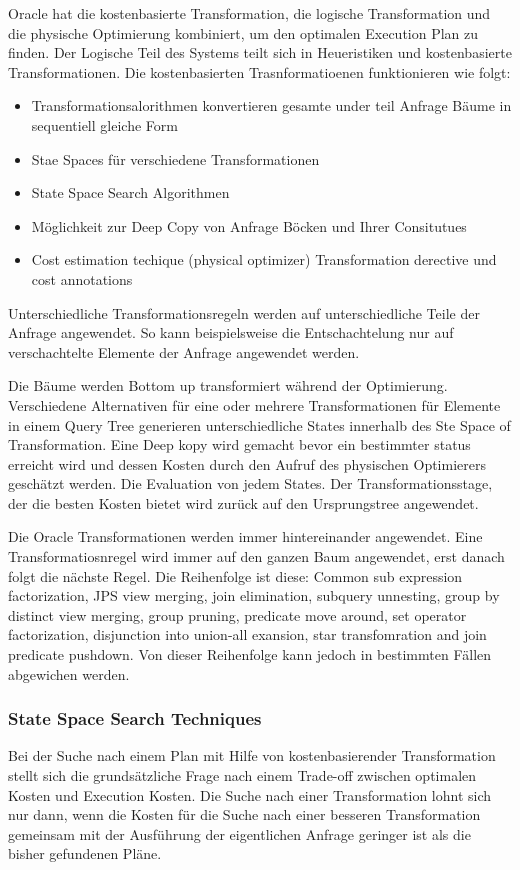 Oracle hat die kostenbasierte Transformation, die logische Transformation und die physische Optimierung kombiniert, um den optimalen Execution Plan zu finden. Der Logische Teil des Systems teilt sich in Heueristiken und kostenbasierte Transformationen. Die kostenbasierten Trasnformatioenen funktionieren wie folgt:

\begin{itemize}
\item Transformationsalorithmen konvertieren gesamte under teil Anfrage Bäume in sequentiell gleiche Form
\item Stae Spaces für verschiedene Transformationen
\item State Space Search Algorithmen
\item Möglichkeit zur Deep Copy von Anfrage Böcken und Ihrer Consitutues
\item Cost estimation techique (physical optimizer)
Transformation derective und cost annotations
\end{itemize}

Unterschiedliche Transformationsregeln werden auf unterschiedliche Teile der Anfrage angewendet. So kann beispielsweise die Entschachtelung nur auf verschachtelte Elemente der Anfrage angewendet werden. 

Die Bäume werden Bottom up transformiert während der Optimierung. Verschiedene Alternativen für eine oder mehrere Transformationen für Elemente in einem Query Tree generieren unterschiedliche States innerhalb des Ste Space of Transformation. Eine Deep kopy wird gemacht bevor ein bestimmter status erreicht wird und dessen Kosten durch den Aufruf des physischen Optimierers geschätzt werden. Die Evaluation von jedem States. Der Transformationsstage, der die besten Kosten bietet wird zurück auf den Ursprungstree angewendet.

Die Oracle Transformationen werden immer hintereinander angewendet. Eine Transformatiosnregel wird immer auf den ganzen Baum angewendet, erst danach folgt die nächste Regel. Die Reihenfolge ist diese: Common sub expression factorization, JPS view merging, join elimination, subquery unnesting, group by distinct view merging, group pruning, predicate move around, set operator factorization, disjunction into union-all exansion, star transfomration and join predicate pushdown. Von dieser Reihenfolge kann jedoch in bestimmten Fällen abgewichen werden. 



\subsubsection{State Space Search Techniques}
Bei der Suche nach einem Plan mit Hilfe von kostenbasierender Transformation stellt sich die grundsätzliche Frage nach einem Trade-off zwischen optimalen Kosten und Execution Kosten. Die Suche nach einer Transformation lohnt sich nur dann, wenn die Kosten für die Suche nach einer besseren Transformation gemeinsam mit der Ausführung der eigentlichen Anfrage geringer ist als die bisher gefundenen Pläne.

